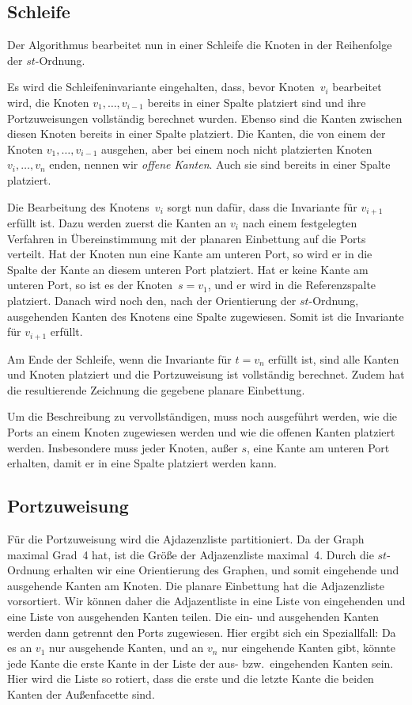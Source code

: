 \documentclass[a4paper]{scrreprt}
\theoremstyle{definition}
\begin{document}
\subsection{Schleife}

Der Algorithmus bearbeitet nun in einer Schleife die Knoten in der Reihenfolge der $st$-Ordnung.

Es wird die Schleifeninvariante eingehalten, dass, bevor Knoten~$v_i$ bearbeitet wird, die Knoten $v_1, \dots, v_{i-1}$ bereits in einer Spalte platziert sind und ihre Portzuweisungen vollständig berechnet wurden. Ebenso sind die Kanten zwischen diesen Knoten bereits in einer Spalte platziert. Die Kanten, die von einem der Knoten $v_1, \dots, v_{i-1}$ ausgehen, aber bei einem noch nicht platzierten Knoten $v_i, \dots, v_n$ enden, nennen wir \emph{offene Kanten}. Auch sie sind bereits in einer Spalte platziert.

Die Bearbeitung des Knotens~$v_i$ sorgt nun dafür, dass die Invariante für $v_{i+1}$ erfüllt ist. Dazu werden zuerst die Kanten an $v_i$ nach einem festgelegten Verfahren in Übereinstimmung mit der planaren Einbettung auf die Ports verteilt. Hat der Knoten nun eine Kante am unteren Port, so wird er in die Spalte der Kante an diesem unteren Port platziert. Hat er keine Kante am unteren Port, so ist es der Knoten~$s = v_1$, und er wird in die Referenzspalte platziert. Danach wird noch den, nach der Orientierung der $st$-Ordnung, ausgehenden Kanten des Knotens eine Spalte zugewiesen. Somit ist die Invariante für $v_{i+1}$ erfüllt.

Am Ende der Schleife, wenn die Invariante für $t = v_n$ erfüllt ist, sind alle Kanten und Knoten platziert und die Portzuweisung ist vollständig berechnet. Zudem hat die resultierende Zeichnung die gegebene planare Einbettung.

Um die Beschreibung zu vervollständigen, muss noch ausgeführt werden, wie die Ports an einem Knoten zugewiesen werden und wie die offenen Kanten platziert werden. Insbesondere muss jeder Knoten, außer $s$, eine Kante am unteren Port erhalten, damit er in eine Spalte platziert werden kann.

\subsection{Portzuweisung}
\label{sec:portdistribution}

Für die Portzuweisung wird die Ajdazenzliste partitioniert. Da der Graph maximal Grad~4 hat, ist die Größe der Adjazenzliste maximal~4. Durch die $st$-Ordnung erhalten wir eine Orientierung des Graphen, und somit eingehende und ausgehende Kanten am Knoten. Die planare Einbettung hat die Adjazenzliste vorsortiert. Wir können daher die Adjazentliste in eine Liste von eingehenden und eine Liste von ausgehenden Kanten teilen. Die ein- und ausgehenden Kanten werden dann getrennt den Ports zugewiesen. Hier ergibt sich ein Speziallfall: Da es an $v_1$ nur ausgehende Kanten, und an $v_n$ nur eingehende Kanten gibt, könnte jede Kante die erste Kante in der Liste der aus- bzw.\ eingehenden Kanten sein. Hier wird die Liste so rotiert, dass die erste und die letzte Kante die beiden Kanten der Außenfacette sind.
\end{document}
